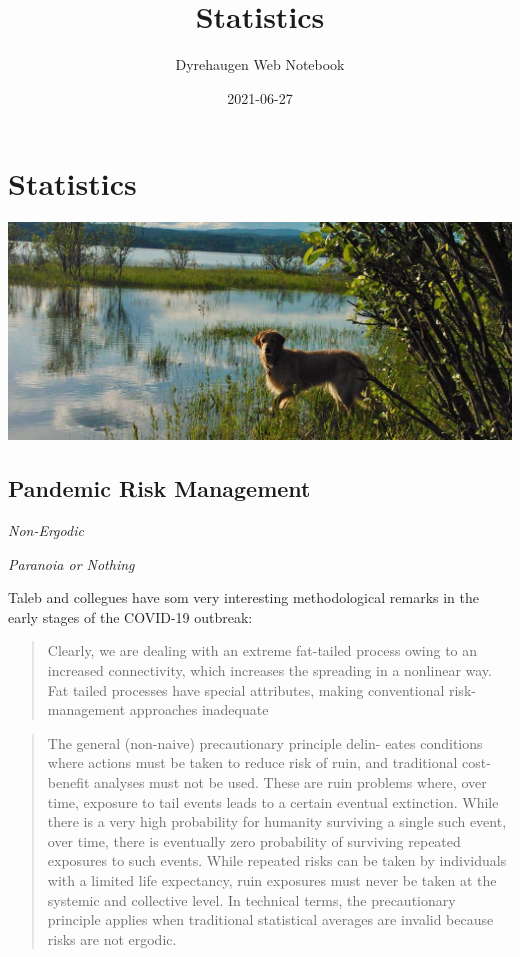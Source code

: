 \documentclass[
]{book}
\title{Statistics}
\author{Dyrehaugen Web Notebook}
\date{2021-06-27}
\begin{document}
\maketitle

{
\setcounter{tocdepth}{1}
\tableofcontents
}
\hypertarget{statistics}{%
\chapter{Statistics}\label{statistics}}

\includegraphics{fig/zelda.jpg}

\hypertarget{pandemic-risk-management}{%
\section{Pandemic Risk Management}\label{pandemic-risk-management}}

\emph{Non-Ergodic}

\emph{Paranoia or Nothing}

Taleb and collegues have som very interesting methodological
remarks in the early stages of the COVID-19 outbreak:

\begin{quote}
Clearly, we are dealing with an extreme fat-tailed process
owing to an increased connectivity, which increases the
spreading in a nonlinear way. Fat tailed processes
have special attributes, making conventional risk-management
approaches inadequate
\end{quote}

\begin{quote}
The general (non-naive) precautionary principle delin-
eates conditions where actions must be taken to reduce risk
of ruin, and traditional cost-benefit analyses must not be used.
These are ruin problems where, over time, exposure to tail
events leads to a certain eventual extinction. While there
is a very high probability for humanity surviving a single
such event, over time, there is eventually zero probability of
surviving repeated exposures to such events. While repeated
risks can be taken by individuals with a limited life expectancy,
ruin exposures must never be taken at the systemic and
collective level. In technical terms, the precautionary principle
applies when traditional statistical averages are invalid because
risks are not ergodic.
\end{quote}
\end{document}
